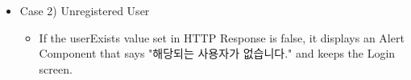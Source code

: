 \documentclass[conference]{IEEEtran}
\begin{document}
\begin{itemize}
\begin{itemize}
\begin{itemize}
\begin{itemize}
            \end{itemize}
        \end{itemize}
        \item Case 2) Unregistered User
        \begin{itemize}
            \item If the userExists value set in HTTP Response is false, it displays an Alert Component that says "해당되는 사용자가 없습니다." and keeps the Login screen.
            \\
        \end{itemize}
    \end{itemize}
\end{itemize}

\end{document}
